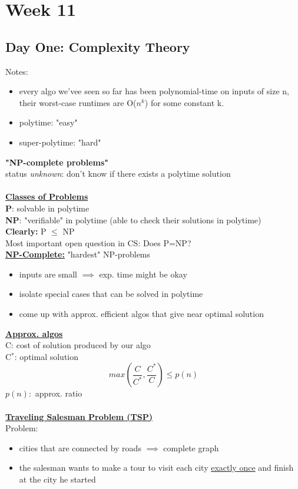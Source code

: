 \documentclass{article}
\begin{document}
	\section{Week 11}
	\subsection{Day One: Complexity Theory}
	Notes:\begin{itemize}
		\item every algo we'vee seen so far has been polynomial-time on inputs of size n, their worst-case runtimes are O($n^k$) for some constant k.
		\item polytime: "easy"
		\item super-polytime: "hard"
	\end{itemize}
	\textbf{"NP-complete problems"\\}
	status \emph{unknown}: don't know if there exists a polytime solution\\\\
	\underline{\textbf{Classes of Problems}}\\
	\textbf{P}: solvable in polytime\\
	\textbf{NP}: "verifiable" in polytime (able to check their solutions in polytime)\\
	\textbf{Clearly:} P $\le$ NP\\
	Most important open question in CS: Does P=NP?\\
	\textbf{\underline{NP-Complete:}} "hardest" NP-problems
	\begin{itemize}
		\item inputs are small $\implies$ exp. time might be okay
		\item isolate special cases that can be solved in polytime
		\item come up with approx. efficient algos that give near optimal solution
	\end{itemize}
	\underline{\textbf{Approx. algos}}\\
	C: cost of solution produced by our algo\\
	C$^*$: optimal solution\\
	$$max(\frac{C}{C^*}, \frac{C^*}{C})\le p(n)$$
	$p(n):$ approx. ratio\\\\
	\underline{\textbf{Traveling Salesman Problem (TSP)}}\\
	Problem:
	\begin{itemize}
		\item cities that are connected by roads $\implies$ complete graph
		\item the salesman wants to make a tour to visit each city \underline{exactly once} and finish at the city he started 
	\end{itemize}
\end{document}
